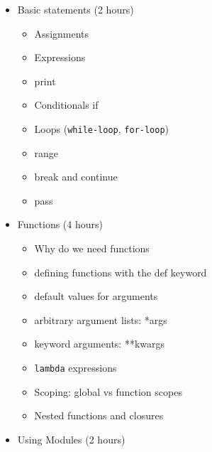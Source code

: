 \documentclass[
]{article}
\providecommand{\tightlist}{%
  \setlength{\itemsep}{0pt}\setlength{\parskip}{0pt}}
\begin{document}
\begin{itemize}
\begin{itemize}
    \begin{itemize}
    \tightlist
    \item
      creating
    \item
      iterating
    \item
      tuples are immutable (sort of)
    \end{itemize}
  \item
    performances of these data structures
  \item
    Toolkit iteration

    \begin{itemize}
    \tightlist
    \item
      enumerate
    \item
      \texttt{zip}
    \end{itemize}
  \end{itemize}
\item
  Basic statements (2 hours)

  \begin{itemize}
  \tightlist
  \item
    Assignments
  \item
    Expressions
  \item
    print
  \item
    Conditionals if
  \item
    Loops (\texttt{while-loop}, \texttt{for-loop})
  \item
    range
  \item
    break and continue
  \item
    pass
  \end{itemize}
\item
  Functions (4 hours)

  \begin{itemize}
  \tightlist
  \item
    Why do we need functions
  \item
    defining functions with the def keyword
  \item
    default values for arguments
  \item
    arbitrary argument lists: *args
  \item
    keyword arguments: **kwargs
  \item
    \texttt{lambda} expressions
  \item
    Scoping: global vs function scopes
  \item
    Nested functions and closures
  \end{itemize}
\item
  Using Modules (2 hours)


\end{itemize}
\end{document}
